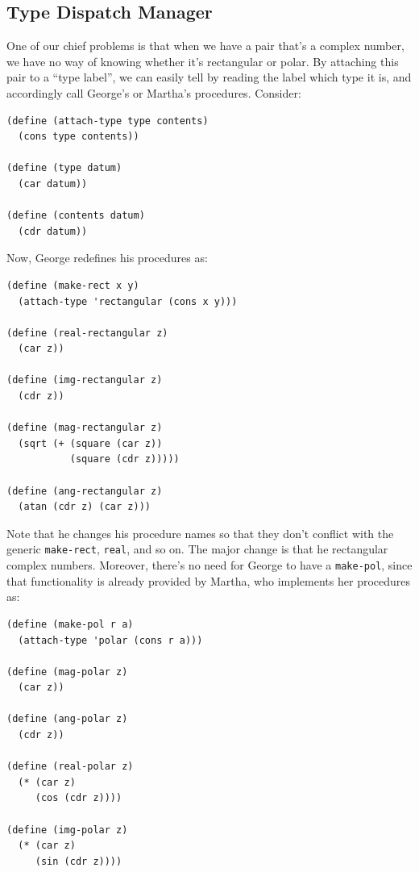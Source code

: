 \documentclass[9pt]{report}
\begin{document}
\subsection{Type Dispatch Manager}
\label{sec:org83a2b55}

One of our chief problems is that when we have a pair that's a
complex number, we have no way of knowing whether it's rectangular
or polar. By attaching this pair to a ``type label'', we can easily
tell by reading the label which type it is, and accordingly call
George's or Martha's procedures. Consider:

\begin{verbatim}
(define (attach-type type contents)
  (cons type contents))

(define (type datum)
  (car datum))

(define (contents datum)
  (cdr datum))
\end{verbatim}

Now, George redefines his procedures as:

\begin{verbatim}
(define (make-rect x y)
  (attach-type 'rectangular (cons x y)))

(define (real-rectangular z)
  (car z))

(define (img-rectangular z)
  (cdr z))

(define (mag-rectangular z)
  (sqrt (+ (square (car z))
           (square (cdr z)))))

(define (ang-rectangular z)
  (atan (cdr z) (car z)))
\end{verbatim}

Note that he changes his procedure names so that they don't
conflict with the generic \texttt{make-rect}, \texttt{real}, and so on. The
major change is that he rectangular complex numbers. Moreover,
there's no need for George to have a \texttt{make-pol}, since that
functionality is already provided by Martha, who implements her
procedures as:

\begin{verbatim}
(define (make-pol r a)
  (attach-type 'polar (cons r a)))

(define (mag-polar z)
  (car z))

(define (ang-polar z)
  (cdr z))

(define (real-polar z)
  (* (car z)
     (cos (cdr z))))

(define (img-polar z)
  (* (car z)
     (sin (cdr z))))
\end{verbatim}
\end{document}
